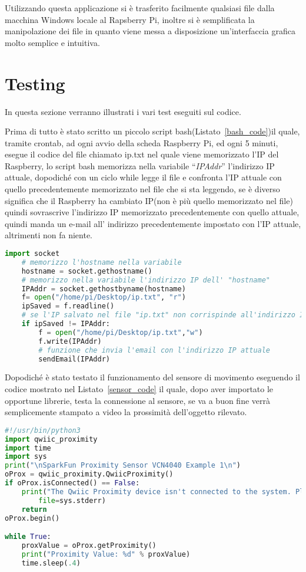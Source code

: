 Utilizzando questa applicazione si è trasferito facilmente qualsiasi file dalla macchina Windows locale al Rapsberry Pi, inoltre si è semplificata la manipolazione dei 
file in quanto viene messa a disposizione un'interfaccia grafica molto semplice e intuitiva.

\section{Testing}
\label{ch:testing}
In questa sezione verranno illustrati i vari test eseguiti sul codice.

Prima di tutto è stato scritto un piccolo script bash(Listato~\ref{bash_code})il quale, tramite crontab, ad ogni avvio della scheda Raspberry Pi, ed ogni 5 minuti, esegue 
il codice del file chiamato ip.txt nel quale viene memorizzato l’IP del Raspberry, lo script bash memorizza nella variabile ``\textsl{IPAddr}'' l'indirizzo IP attuale,
dopodiché con un ciclo while legge il file e confronta l’IP attuale con quello precedentemente memorizzato nel file che si sta leggendo, se è diverso significa che il 
Raspberry ha cambiato IP(non è più quello memorizzato nel file) quindi sovrascrive l’indirizzo IP memorizzato precedentemente con quello attuale, quindi manda un e-mail all' 
indirizzo precedentemente impostato con l’IP attuale, altrimenti non fa niente.
\begin{lstlisting}[language=Python,frame=single,caption=Script bash,captionpos=t,label=bash_code]
    import socket
    # memorizzo l'hostname nella variabile     
    hostname = socket.gethostname()
    # memorizzo nella variabile l'indirizzo IP dell' "hostname"              
    IPAddr = socket.gethostbyname(hostname)     
    f= open("/home/pi/Desktop/ip.txt", "r")
    ipSaved = f.readline()
    # se l'IP salvato nel file "ip.txt" non corrispinde all'indirizzo IP memorizzato nella variabile, modifico il file e mando l'email
    if ipSaved != IPAddr:
        f = open("/home/pi/Desktop/ip.txt","w")
        f.write(IPAddr)
        # funzione che invia l'email con l'indirizzo IP attuale
        sendEmail(IPAddr)
\end{lstlisting}
Dopodiché è stato testato il funzionamento del sensore di movimento eseguendo il codice mostrato nel Listato~\ref{sensor_code} il quale, dopo aver importato le 
opportune librerie, testa la connessione al sensore, se va a buon fine verrà semplicemente stampato a video la prossimità dell'oggetto rilevato.
\begin{lstlisting}[language=Python,frame=single,caption=Codice sensore,captionpos=t,label=sensor_code]
#!/usr/bin/python3
import qwiic_proximity
import time
import sys
print("\nSparkFun Proximity Sensor VCN4040 Example 1\n")
oProx = qwiic_proximity.QwiicProximity()
if oProx.isConnected() == False:
    print("The Qwiic Proximity device isn't connected to the system. Please check your connection", \
        file=sys.stderr)
    return
oProx.begin()

while True:
    proxValue = oProx.getProximity()
    print("Proximity Value: %d" % proxValue)
    time.sleep(.4)
\end{lstlisting}
